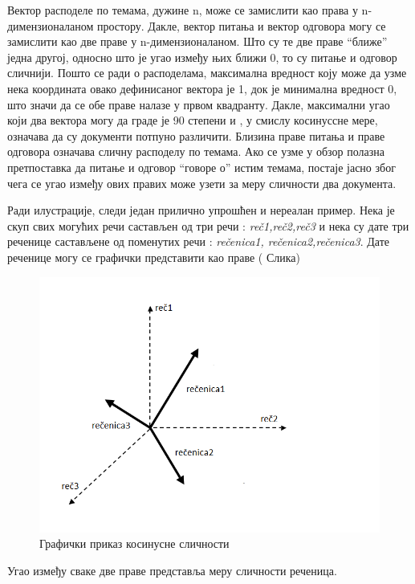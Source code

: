 Вектор расподеле по темама, дужине n, може се замислити  као права у n-димензионаланом простору. Дакле, вектор питања и вектор одговора могу се замислити као две праве у n-димензионаланом. Што су те две праве "`ближе"' једна другој, односно што је угао између њих ближи 0, то су питање и одговор сличнији. 
Пошто се ради о расподелама, максимална вредност коју може да узме нека координата овако дефинисаног вектора је 1, док је минимална вредност 0, што значи да се обе праве налазе у првом квадранту. Дакле, максимални угао који два вектора могу да граде је 90 степени и , у смислу косинуссне мере, означава да су документи потпуно различити.
Близина праве питања и праве одговора означава сличну расподелу по темама. Ако се узме у обзор полазна претпоставка да питање и одговор "`говоре о"' истим темама, постаје јасно због чега се угао између ових правих може узети за меру сличности два документа.

Ради илустрације, следи један прилично упрошћен и нереалан пример. 
Нека је скуп свих могућих речи састављен од три речи : \textit{reč1,reč2,reč3} и нека су дате три реченице састављене од поменутих речи : \textit{rečenica1, rečenica2,rečenica3}. 
Дате реченице могу се графички представити као праве ( Слика)

\begin{figure}[H]
    \centering
   \includegraphics[scale=0.3]{./Slike/kosinusna.png} 
	\caption{Графички приказ косинусне сличности}
	\label{fig:slika1}
\end{figure}

Угао између сваке две праве представља меру сличности реченица.

